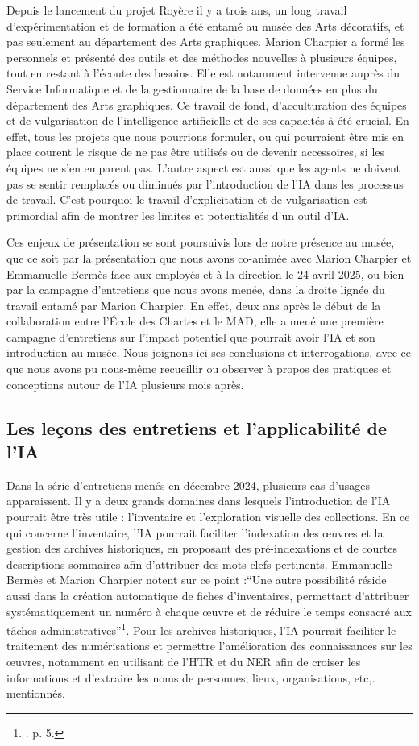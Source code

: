 Depuis le lancement du projet Royère il y a trois ans, un long travail d'expérimentation et de formation a été entamé au musée des Arts décoratifs, et pas seulement au département des Arts graphiques. Marion Charpier a formé les personnels et présenté des outils et des méthodes nouvelles à plusieurs équipes, tout en restant à l'écoute des besoins. Elle est notamment intervenue auprès du Service Informatique et de la gestionnaire de la base de données en plus du département des Arts graphiques. Ce travail de fond, d'acculturation des équipes et de vulgarisation de l'intelligence artificielle et de ses capacités à été crucial. En effet, tous les projets que nous pourrions formuler, ou qui pourraient être mis en place courent le risque de ne pas être utilisés ou de devenir accessoires, si les équipes ne s'en emparent pas. L'autre aspect est aussi que les agents ne doivent pas se sentir remplacés ou diminués par l'introduction de l'IA dans les processus de travail. C'est pourquoi le travail d'explicitation et de vulgarisation est primordial afin de montrer les limites et potentialités d'un outil d'IA.

Ces enjeux de présentation se sont poursuivis lors de notre présence au musée, que ce soit par la présentation que nous avons co-animée avec Marion Charpier et Emmanuelle Bermès face aux employés et à la direction le 24 avril 2025, ou bien par la campagne d'entretiens que nous avons menée, dans la droite lignée du travail entamé par Marion Charpier. En effet, deux ans après le début de la collaboration entre l'École des Chartes et le MAD, elle a mené une première campagne d'entretiens sur l'impact potentiel que pourrait avoir l'IA et son introduction au musée. Nous joignons ici ses conclusions et interrogations, avec ce que nous avons pu nous-même recueillir ou observer à propos des pratiques et conceptions autour de l'IA plusieurs mois après.

\subsection{Les leçons des entretiens et l'applicabilité de l'IA}

Dans la série d'entretiens menés en décembre 2024, plusieurs cas d'usages apparaissent. Il y a deux grands domaines dans lesquels l'introduction de l'IA pourrait être très utile : l'inventaire et l'exploration visuelle des collections. En ce qui concerne l'inventaire, l'IA pourrait faciliter l'indexation des œuvres et la gestion des archives historiques, en proposant des pré-indexations et de courtes descriptions sommaires afin d'attribuer des mots-clefs pertinents. Emmanuelle Bermès et Marion Charpier notent sur ce point :\enquote{Une autre possibilité réside aussi dans la création automatique de fiches d'inventaires, permettant d'attribuer systématiquement un numéro à chaque œuvre et de réduire le temps consacré aux tâches administratives}\footnote{\cite{bermes_repenser_2025}. p. 5.}. Pour les archives historiques, l'IA pourrait faciliter le traitement des numérisations et permettre l'amélioration des connaissances sur les œuvres, notamment en utilisant de l'HTR et du NER afin de croiser les informations et d'extraire les noms de personnes, lieux, organisations, etc,. mentionnés.

